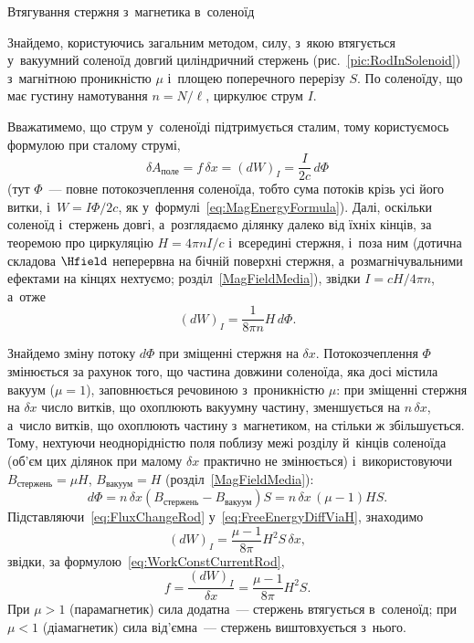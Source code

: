 \begin{Example}{Втягування стержня з~магнетика в~соленоїд}

	Знайдемо, користуючись загальним методом, силу, з~якою втягується у~вакуумний соленоїд
	довгий циліндричний стержень (рис.~\ref{pic:RodInSolenoid}) з~магнітною проникністю $\mu$ і~площею поперечного
	перерізу $S$. По соленоїду, що має густину намотування $n=N/\ell$, циркулює струм $I$.

	Вважатимемо, що струм у~соленоїді підтримується сталим, тому користуємось формулою при
	сталому струмі,
	\begin{equation}\label{eq:WorkConstCurrentRod}
		\delta A_\text{поле} = f\,\delta x = \left(dW\right)_{I} = \frac{I}{2c}\,d\Phi
	\end{equation}
	(тут $\Phi$~--- повне потокозчеплення соленоїда, тобто сума потоків крізь усі його витки, і~$W=I\Phi/2c$, як
	у~формулі~\eqref{eq:MagEnergyFormula}). Далі, оскільки соленоїд і~стержень довгі, а~розглядаємо ділянку далеко від їхніх кінців, за теоремою про циркуляцію $H=4\pi n I/c$ і~всередині стержня, і~поза ним (дотична складова $\Hfield$ неперервна на бічній поверхні стержня, а~розмагнічувальними ефектами на кінцях нехтуємо; розділ~\ref{MagFieldMedia}), звідки $I=cH/4\pi n$, а~отже
	\begin{equation}\label{eq:FreeEnergyDiffViaH}
		\left(dW\right)_{I} = \frac1{8\pi n}H\,d\Phi.
	\end{equation}

	Знайдемо зміну потоку $d\Phi$ при зміщенні стержня на $\delta x$. Потокозчеплення $\Phi$
	змінюється за рахунок того, що частина довжини соленоїда, яка досі
	містила вакуум ($\mu=1$), заповнюється речовиною з~проникністю $\mu$: при зміщенні
	стержня на $\delta x$ число витків, що охоплюють вакуумну частину, зменшується на
	$n\,\delta x$, а~число витків, що охоплюють частину з~магнетиком, на стільки ж
	збільшується. Тому, нехтуючи неоднорідністю поля поблизу межі розділу й~кінців
	соленоїда (об'єм цих ділянок при малому $\delta x$ практично не змінюється)
	і~використовуючи $B_\text{стержень}=\mu H$, $B_\text{вакуум}=H$
	(розділ~\ref{MagFieldMedia}):
	\begin{equation}\label{eq:FluxChangeRod}
		d\Phi = n\,\delta x\left(B_\text{стержень}-B_\text{вакуум}\right)S = n\,\delta x\,(\mu-1)HS.
	\end{equation}
	Підставляючи~\eqref{eq:FluxChangeRod} у~\eqref{eq:FreeEnergyDiffViaH}, знаходимо
	\begin{equation*}
		\left(dW\right)_{I} = \frac{\mu-1}{8\pi}H^2S\,\delta x,
	\end{equation*}
	звідки, за формулою~\eqref{eq:WorkConstCurrentRod},
	\begin{equation}\label{eq:ForceOnRod}
		f = \frac{\left(dW\right)_{I}}{\delta x} = \frac{\mu-1}{8\pi}H^2S.
	\end{equation}
	При $\mu>1$ (парамагнетик) сила додатна~--- стержень втягується в~соленоїд; при
	$\mu<1$ (діамагнетик) сила від'ємна~--- стержень виштовхується з~нього.
\end{Example}

